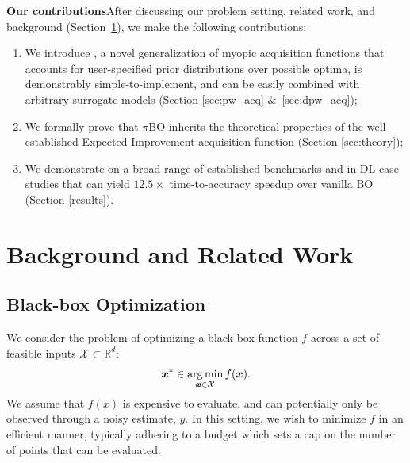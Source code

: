 \documentclass{article}
\newcommand{\method}[0]{\text{${\pi}$BO}\xspace}
\begin{document}
\textbf{Our contributions}\quad After discussing our problem setting, related work, and background (Section~\ref{sec:background}), we make the following contributions:
\begin{enumerate}
    \item We introduce \method, a novel generalization of myopic acquisition functions that accounts for user-specified prior distributions over possible optima, is demonstrably simple-to-implement, and can be easily combined with arbitrary surrogate models (Section \ref{sec:pw_acq} \&~\ref{sec:dpw_acq});
    \item We formally prove that $\pi$BO inherits the theoretical properties of the well-established Expected Improvement acquisition function (Section \ref{sec:theory});
    \item We demonstrate on a broad range of established benchmarks and in DL case studies that \method can yield $12.5\times$ time-to-accuracy speedup over vanilla BO (Section \ref{results}).
\end{enumerate}


\section{Background and Related Work}\label{sec:background}

\subsection{Black-box Optimization} 
We consider the problem of optimizing a black-box function $f$ across a set of feasible inputs $\mathcal{X}\subset\mathbb{R}^d$:
\begin{equation}
    \bm{x}^* \in \mathop{\mathrm{arg\,min}}_{\bm{x}\in \mathcal{X}} f(\bm{x}).
    \label{eq:boo}
    \end{equation}
We assume that $f(x)$ is expensive to evaluate, and can potentially only be observed through a noisy estimate, $y$. In this setting, we wish to minimize $f$ in an efficient manner, typically adhering to a budget which sets a cap on the number of points that can be evaluated. 
\end{document}
